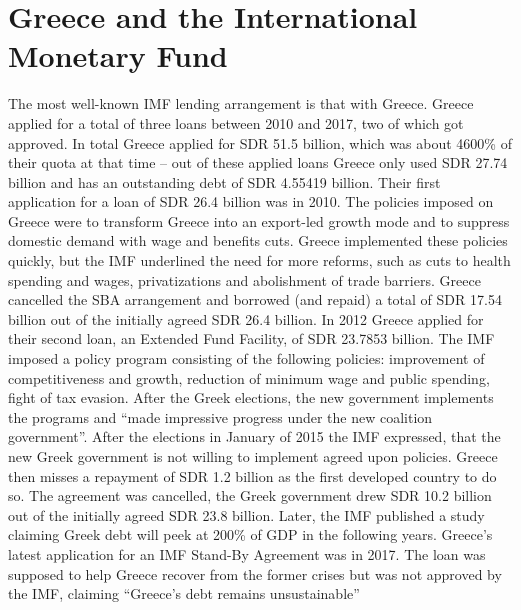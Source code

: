 \section{Greece and the International Monetary Fund}
\label{sec:greece}
The most well-known \gls{IMF} lending arrangement is that with Greece. Greece applied for a total of three loans between 2010 and 2017, two of which got approved. In total Greece applied for \gls{SDR} 51.5 billion, which was about 4600\% of their quota at that time – out of these applied loans Greece only used \gls{SDR} 27.74 billion and has an outstanding debt of \gls{SDR} 4.55419 billion.\cite{InternationalMonetaryFundPressRelease2020}\cite{InternationalMonetaryFundGreeceand2020}
Their first application for a loan of \gls{SDR} 26.4 billion was in 2010. The policies imposed on Greece were to transform Greece into an export-led growth mode and to suppress domestic demand with wage and benefits cuts. Greece implemented these policies quickly, but the \gls{IMF} underlined the need for more reforms, such as cuts to health spending and wages, privatizations and abolishment of trade barriers. Greece cancelled the SBA arrangement and borrowed (and repaid) a total of \gls{SDR} 17.54 billion out of the initially agreed \gls{SDR} 26.4 billion.\cite{WikipediaGreeceand2020}
In 2012 Greece applied for their second loan, an Extended Fund Facility, of \gls{SDR} 23.7853 billion. The \gls{IMF} imposed a policy program consisting of the following policies: improvement of competitiveness and growth, reduction of minimum wage and public spending, fight of tax evasion. After the Greek elections, the new government implements the programs and “made impressive progress under the new coalition government”.\cite{InternationalMonetaryFundIMFSurvey2013} After the elections in January of 2015 the \gls{IMF} expressed, that the new Greek government is not willing to implement agreed upon policies. Greece then misses a repayment of \gls{SDR} 1.2 billion as the first developed country to do so.\cite{CasertElenaBecatorosandRafGreecefails2015} The agreement was cancelled, the Greek government drew \gls{SDR} 10.2 billion out of the initially agreed \gls{SDR} 23.8 billion. Later, the \gls{IMF} published a study claiming Greek debt will peek at 200\% of GDP in the following years.\cite{InternationalMonetaryFund.EuropeanDept2015}
Greece’s latest application for an \gls{IMF} Stand-By Agreement was in 2017. The loan was supposed to help Greece recover from the former crises but was not approved by the \gls{IMF}, claiming “Greece’s debt remains unsustainable”\cite{InternationalMonetaryFundIMFExecutive2017}
